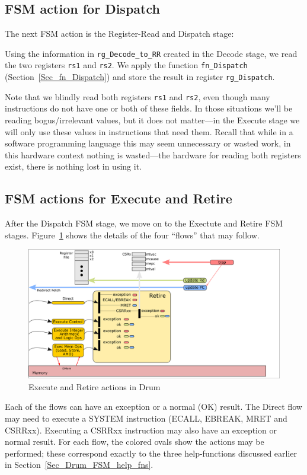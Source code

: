 \subsection{FSM action for Dispatch}

The next FSM action is the Register-Read and Dispatch stage:


Using the information in \verb|rg_Decode_to_RR| created in the Decode
stage, we read the two registers \verb|rs1| and \verb|rs2|.  We apply
the function \verb|fn_Dispatch| (Section~\ref{Sec_fn_Dispatch}) and
store the result in register \verb|rg_Dispatch|.

Note that we blindly read both registers \verb|rs1| and \verb|rs2|,
even though many instructions do not have one or both of these fields.
In those situations we'll be reading bogus/irrelevant values, but it
does not matter---in the Execute stage we will only use these values
in instructions that need them. Recall that while in a software
programming language this may seem unnecessary or wasted work, in this
hardware context nothing is wasted---the hardware for reading both
registers exist, there is nothing lost in using it.


\subsection{FSM actions for Execute and Retire}

After the Dispatch FSM stage, we move on to the Exectute and Retire
FSM stages.  Figure~\ref{Fig_Retire_Drum} shows the details of the
four ``flows'' that may follow.
\begin{figure}[htbp]
  \centerline{\includegraphics[width=6in,angle=0]{Figures/Fig_Retire_Layers_1}}
  \caption{\label{Fig_Retire_Drum}Execute and Retire actions in Drum}
\end{figure}
Each of the flows can have an exception or a normal (OK) result.  The
Direct flow may need to execute a SYSTEM instruction (ECALL, EBREAK,
MRET and CSRRxx).  Executing a CSRRxx instruction may also have an
exception or normal result.  For each flow, the colored ovals show the
actions may be performed; these correspond exactly to the three
help-functions discussed earlier in Section~\ref{Sec_Drum_FSM_help_fns}.

